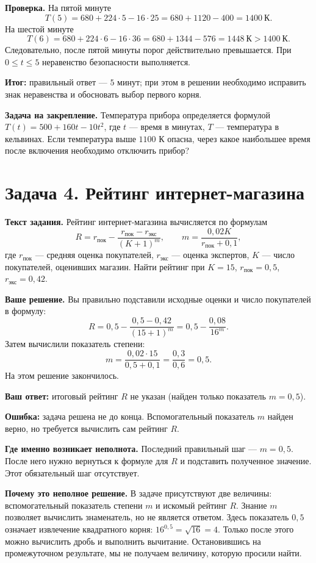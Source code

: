 \documentclass[12pt,a4paper]{article}
\newcommand{\ReviewField}[1]{{\color{ReviewTeal}\bfseries #1}\space}
\newcommand{\ReviewError}[1]{{\color{ReviewErrorInk}\bfseries #1}\space}
\begin{document}
\ReviewField{Проверка.} На пятой минуте
\[
T(5)=680+224\cdot5-16\cdot25=680+1120-400=1400\ \text{К}.
\]
На шестой минуте
\[
T(6)=680+224\cdot6-16\cdot36=680+1344-576=1448\ \text{К}>1400\ \text{К}.
\]
Следовательно, после пятой минуты порог действительно превышается. При $0\le t\le5$ неравенство безопасности выполняется.

\ReviewField{Итог:} правильный ответ --- $5$ минут; при этом в решении необходимо исправить знак неравенства и обосновать выбор первого корня.

\ReviewField{Задача на закрепление.} Температура прибора определяется формулой $T(t)=500+160t-10t^2$, где $t$ --- время в минутах, $T$ --- температура в кельвинах. Если температура выше $1100$ К опасна, через какое наибольшее время после включения необходимо отключить прибор?

\newpage
{}\label{task:applied4}
\section*{Задача 4. Рейтинг интернет-магазина}
\ReviewField{Текст задания.} Рейтинг интернет-магазина вычисляется по формулам
\[
R=r_{\text{пок}}-\frac{r_{\text{пок}}-r_{\text{экс}}}{(K+1)^m},
\qquad
m=\frac{0{,}02K}{r_{\text{пок}}+0{,}1},
\]
где $r_{\text{пок}}$ --- средняя оценка покупателей, $r_{\text{экс}}$ --- оценка экспертов, $K$ --- число покупателей, оценивших магазин. Найти рейтинг при $K=15$, $r_{\text{пок}}=0{,}5$, $r_{\text{экс}}=0{,}42$.

\ReviewField{Ваше решение.} Вы правильно подставили исходные оценки и число покупателей в формулу:
\[
R=0{,}5-\frac{0{,}5-0{,}42}{(15+1)^m}
=0{,}5-\frac{0{,}08}{16^m}.
\]
Затем вычислили показатель степени:
\[
m=\frac{0{,}02\cdot15}{0{,}5+0{,}1}
=\frac{0{,}3}{0{,}6}=0{,}5.
\]
На этом решение закончилось.

\ReviewField{Ваш ответ:} итоговый рейтинг $R$ не указан (найден только показатель $m=0{,}5$).

\ReviewError{Ошибка:} задача решена не до конца. Вспомогательный показатель $m$ найден верно, но требуется вычислить сам рейтинг $R$.

\ReviewField{Где именно возникает неполнота.} Последний правильный шаг --- $m=0{,}5$. После него нужно вернуться к формуле для $R$ и подставить полученное значение. Этот обязательный шаг отсутствует.

\ReviewField{Почему это неполное решение.} В задаче присутствуют две величины: вспомогательный показатель степени $m$ и искомый рейтинг $R$. Знание $m$ позволяет вычислить знаменатель, но не является ответом. Здесь показатель $0{,}5$ означает извлечение квадратного корня: $16^{0{,}5}=\sqrt{16}=4$. Только после этого можно вычислить дробь и выполнить вычитание. Остановившись на промежуточном результате, мы не получаем величину, которую просили найти.
\end{document}

